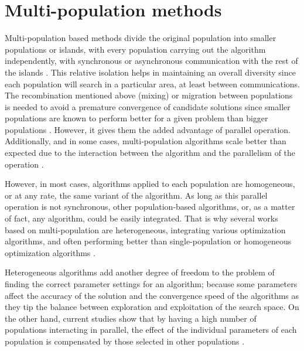 \documentclass[review]{elsarticle}
\begin{document}
\section{Multi-population methods} %
\label{multi}

Multi-population based methods divide the original population into
smaller populations or islands, with every population carrying out the
algorithm independently, with synchronous or asynchronous communication with the
rest of the islands \cite{Ma2019}.%
This relative isolation helps in maintaining an overall
diversity since each population will search in a particular area, at least
between communications. The recombination mentioned above (mixing) or migration
between populations is needed to avoid a premature convergence of candidate
solutions since smaller populations are known to perform better for a given
problem than bigger populations \cite{li2016multi,wu2016differential}. %
However, it gives them the added advantage of
parallel operation. Additionally, and in some cases, multi-population algorithms
scale better than expected due to the interaction between the algorithm and the
parallelism of the operation \cite{ALBA20027}. %

However, in most cases, algorithms applied to each population are
homogeneous, or at any rate, the same variant of the algorithm. As long as this
parallel operation is not synchronous, other population-based algorithms, or, as
a matter of fact, any algorithm, could be easily integrated. That is why several
works based on multi-population are heterogeneous, integrating various
optimization algorithms, and often performing better than single-population or
homogeneous optimization algorithms \cite{wu2016differential,nseef2016adaptive}.

Heterogeneous algorithms add another degree of freedom to the problem of finding
the correct parameter settings for an algorithm; because some parameters affect
the accuracy of the solution and the convergence speed of the algorithms as they
tip the balance between exploration and exploitation of the search space. On the
other hand, current studies show that by having a high number of populations
interacting in parallel, the effect of the individual parameters of each
population is compensated by those selected in other
populations \cite{li2016multi,tanabe2013evaluation}. %
\end{document}
